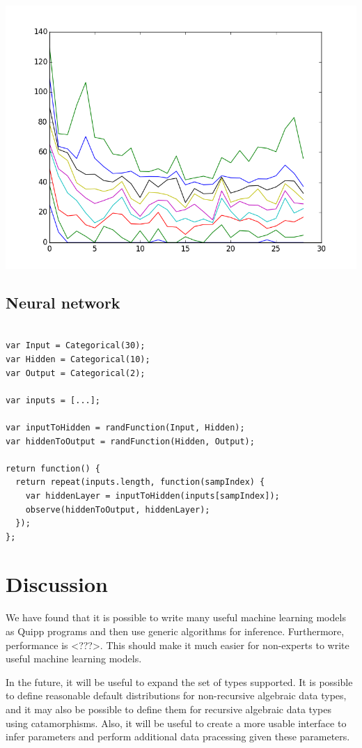 \documentclass{article}
\begin{document}
\begin{center}
  \includegraphics[scale=0.5]{../plots/accuracy_lda.png}
\end{center}
\subsection{Neural network}

{\small
\begin{lstlisting}

var Input = Categorical(30);
var Hidden = Categorical(10);
var Output = Categorical(2);

var inputs = [...];

var inputToHidden = randFunction(Input, Hidden);
var hiddenToOutput = randFunction(Hidden, Output);

return function() {
  return repeat(inputs.length, function(sampIndex) {
    var hiddenLayer = inputToHidden(inputs[sampIndex]);
    observe(hiddenToOutput, hiddenLayer);
  });
};
\end{lstlisting}
}

  \section{Discussion}

  We have found that it is possible to write many useful machine learning models as Quipp programs and then use generic algorithms for inference.  Furthermore, performance is <???>.  This should make it much easier for non-experts to write useful machine learning models.
  
  In the future, it will be useful to expand the set of types supported.  It is possible to define reasonable default distributions for non-recursive algebraic data types, and it may also be possible to define them for recursive algebraic data types using catamorphisms.  Also, it will be useful to create a more usable interface to infer parameters and perform additional data pracessing given these parameters.

{}

\end{document}
